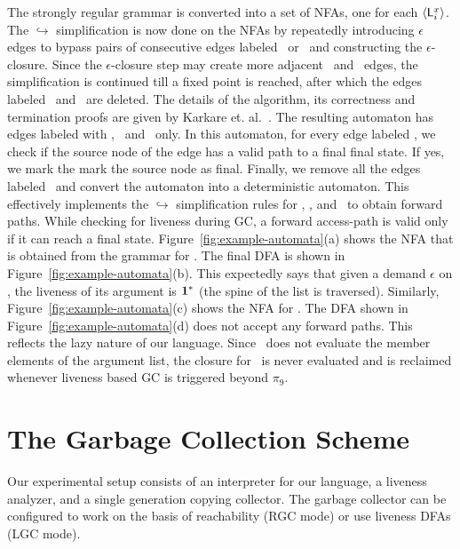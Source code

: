 \documentclass[preprint,9pt]{sigplanconf}
\begin{document}
The strongly regular grammar is converted  into a set of NFAs, one for
each $\langle \mathsf{L}_{{i}}^{x}\rangle$.  The $\hookrightarrow$ simplification is now
done on the NFAs by  repeatedly introducing $\epsilon$ edges to bypass
pairs  of consecutive  edges labeled  \bcar\acar\ or  \bcdr\acdr\ and
constructing the $\epsilon$-closure. Since the $\epsilon$-closure step
may  create  more  adjacent  \bcar\acar\ and  \bcdr\acdr\  edges,  the
simplification is continued till a fixed point is reached, after which
the edges labeled \bcar \ and  \bcdr\ are deleted.  The details of the
algorithm, its correctness and termination proofs are given by Karkare
et.  al.~\cite{karkare07liveness,asati14lgc}.  The resulting automaton
has  edges labeled  with  \acar,  \acdr\ and  \clazy\  only. In  this
automaton, for every edge labeled \clazy, we check if the source node
of the edge has a valid path to  a final final state.  If yes, we mark
the mark  the source node as  final. Finally, we remove  all the edges
labeled  \clazy\  and  convert  the automaton  into  a  deterministic
automaton.    This   effectively  implements   the   $\hookrightarrow$
simplification rules for  \bcar, \bcdr, and \clazy\  to obtain forward
paths. While  checking for liveness  during GC, a  forward access-path
is valid only if it can reach a final state. 
Figure~\ref{fig:example-automata}(a)  shows the  NFA that  is obtained
from the grammar for .  The final DFA is shown in
Figure~\ref{fig:example-automata}(b).  This expectedly says that given
a  demand $\epsilon$  on  \length,  the liveness  of  its argument  is
$\mathbf{1}^{*}$  (the  spine  of   the  list  is  traversed).   Similarly,
Figure~\ref{fig:example-automata}(c)     shows     the     NFA     for
.          The         DFA         shown         in
Figure~\ref{fig:example-automata}(d)  does  not   accept  any  forward
paths.   This  reflects  the  lazy  nature  of  our  language.   Since
\length\ does not  evaluate the member elements of  the argument list,
the  closure for  \pa\ is  never evaluated  and is  reclaimed whenever
liveness based GC is triggered beyond $\pi_9$.


\section{The Garbage Collection Scheme}
\label{sec:GC-scheme}

Our experimental setup  consists of an interpreter
for  our  language,  a liveness  analyzer,  and  a
single generation copying  collector.  The garbage
collector can be configured to work on the
basis  of  reachability  (RGC  mode)  or  use  
liveness  DFAs  (LGC  mode).  
\end{document}
